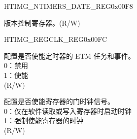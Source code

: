 \begin{register}{H}{TIMG\_NTIMERS\_DATE\_REG}{0x00F8}\label{regdesc:TIMGNTIMERSDATEREG}
%
%
\regnewline%
\begin{regdesc}\begin{reglist}
\label{fielddesc:TIMGNTIMGSDATE}\item [TIMG\_NTIMGS\_DATE] 版本控制寄存器。(R/W)
\end{reglist}\end{regdesc}
\end{register}


\begin{register}{H}{TIMG\_REGCLK\_REG}{0x00FC}\label{regdesc:TIMGREGCLKREG}
%
%
%
%
\regnewline%
\begin{regdesc}\begin{reglist}
\label{fielddesc:TIMGETMEN}\item [TIMG\_ETM\_EN] 配置是否使能定时器的 ETM 任务和事件。\\
0：禁用 \\
1：使能 \\ (R/W)
\label{fielddesc:TIMGCLKEN}\item [TIMG\_CLK\_EN] 配置是否使能寄存器的门时钟信号。\\
0：仅在软件读取或写入寄存器时启动时钟 \\
1：强制使能寄存器的时钟 \\ (R/W)
\end{reglist}\end{regdesc}
\end{register}
